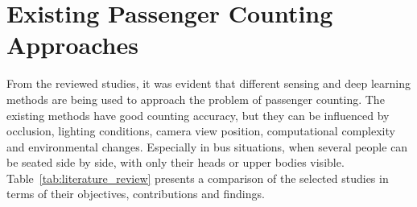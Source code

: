 \documentclass[12pt,a4paper]{report}
\begin{document}
\section{Existing Passenger Counting Approaches}

From the reviewed studies, it was evident that different sensing and deep learning methods are being used to approach the problem of passenger counting. The existing methods have good counting accuracy, but they can be influenced by occlusion, lighting conditions, camera view position, computational complexity and environmental changes. Especially in bus situations, when several people can be seated side by side, with only their heads or upper bodies visible. Table~\ref{tab:literature_review} presents a comparison of the selected studies in terms of their objectives, contributions and findings.
\end{document}

